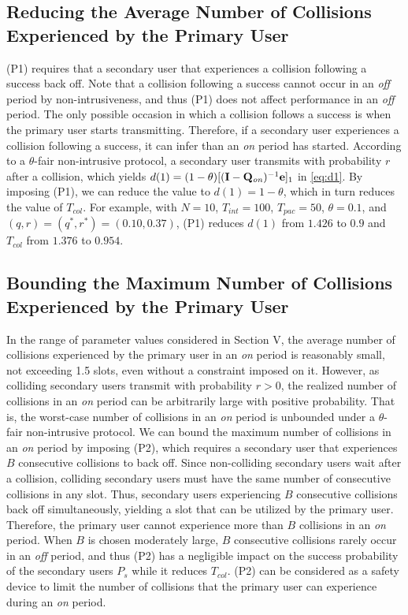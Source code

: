 \documentclass[12pt,draftclsnofoot,onecolumn]{IEEEtran}
\begin{document}
\subsection{Reducing the Average Number of Collisions Experienced by the Primary User}

(P1) requires that a secondary user that experiences a collision following a success back off.
Note that a collision following a success cannot occur in an \emph{off} period by non-intrusiveness,
and thus (P1) does not affect performance in an \emph{off} period.
The only possible occasion in which a collision follows a success is when the
primary user starts transmitting. Therefore, if a secondary user experiences
a collision following a success, it can infer than an \emph{on} period has started.
According to a $\theta$-fair non-intrusive protocol, a secondary user transmits
with probability $r$ after a collision, which yields $d(1) = (1-\theta)
[ (\mathbf{I} - \mathbf{Q}_{\textrm{\emph{on}}})^{-1} \mathbf{e} ]_1$ in \eqref{eq:d1}.
By imposing (P1), we can reduce the value to $d(1) = 1 - \theta$, which in turn
reduces the value of $T_{col}$. For example, with $N = 10$, $T_{int} = 100$, $T_{pac} = 50$, $\theta = 0.1$,
and $(q,r) = (q^*,r^*) = (0.10, 0.37)$,
(P1) reduces $d(1)$ from $1.426$ to $0.9$ and $T_{col}$ from $1.376$ to $0.954$.

\subsection{Bounding the Maximum Number of Collisions Experienced by the Primary User}

In the range of parameter values considered in Section V, the average number of
collisions experienced by the primary user in an \emph{on} period is reasonably small,
not exceeding 1.5 slots, even without a constraint imposed on it. However, as colliding secondary users transmit with probability $r > 0$,
the realized number of collisions in an \emph{on} period can be arbitrarily large
with positive probability. That is, the worst-case number of collisions in an \emph{on} period
is unbounded under a $\theta$-fair non-intrusive protocol. We can bound the maximum
number of collisions in an \emph{on} period by imposing (P2), which requires
a secondary user that experiences $B$ consecutive collisions to back off.
Since non-colliding secondary users wait after a collision, colliding secondary users must have the same number
of consecutive collisions in any slot. Thus, secondary users experiencing $B$ consecutive collisions
back off simultaneously, yielding a slot that can be utilized by the primary user.
Therefore, the primary user cannot experience more than $B$ collisions
in an \emph{on} period. When $B$ is chosen moderately large, $B$ consecutive collisions
rarely occur in an \emph{off} period, and thus (P2) has a negligible impact on
the success probability of the secondary users $P_s$ while it reduces $T_{col}$.
(P2) can be considered
as a safety device to limit the number of collisions that the primary user
can experience during an \emph{on} period.
\end{document}
